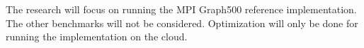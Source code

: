 The research will focus on running the MPI Graph500 reference implementation. The other benchmarks will not be considered. Optimization will only be done for running the implementation on the cloud.